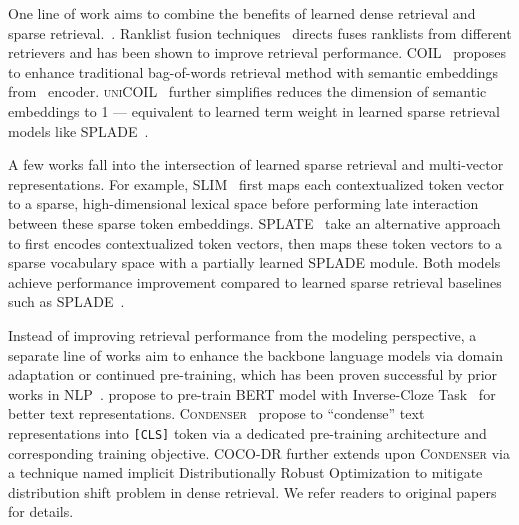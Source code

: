 One line of work aims to combine the benefits of learned dense retrieval and sparse retrieval.~\cite{gao2021complement,gao-etal-2021-coil,ma2021replication,lin2021few,cormack2009reciprocal}.
Ranklist fusion techniques~\cite[e.g., Reciprocal Rank Fusion,][]{cormack2009reciprocal} directs fuses ranklists from different retrievers and has been shown to improve retrieval performance. \textsc{COIL}~\cite{gao-etal-2021-coil} proposes to enhance traditional bag-of-words retrieval method with semantic embeddings from \bert~encoder. \textsc{uniCOIL}~\cite{lin2021few} further simplifies reduces the dimension of semantic embeddings to 1 --- equivalent to learned term weight in learned sparse retrieval models like \textsc{SPLADE}~\cite{formal21splade,formal21spladev2}. 

A few works fall into the intersection of learned sparse retrieval and multi-vector representations. For example, \textsc{SLIM}~\cite{li2023slim} first maps each contextualized token vector to a sparse, high-dimensional lexical space before performing late interaction between these sparse token embeddings. \textsc{SPLATE}~\cite{formal2024splate} take an alternative approach to first encodes contextualized token vectors, then maps these token vectors to a sparse vocabulary space with a partially learned \textsc{SPLADE} module. Both models achieve performance improvement compared to learned sparse retrieval baselines such as \textsc{SPLADE}~\cite{formal21splade,formal21spladev2}.

Instead of improving retrieval performance from the modeling perspective, a separate line of works aim to enhance the backbone language models via domain adaptation or continued pre-training, which has been proven successful by prior works in NLP~\cite{howard2018universal,gururangan-etal-2020-dont}. 
\citet{Lee2019LatentRF} propose to pre-train \textsc{BERT} model with Inverse-Cloze Task~\cite{Taylor1953ClozePA} for better text representations.
\textsc{Condenser}~\cite{gao-callan-2021-condenser} propose to ``condense'' text representations into \texttt{[CLS]} token via a dedicated pre-training architecture and corresponding training objective. 
\textsc{COCO-DR} further extends upon \textsc{Condenser} via a technique named implicit Distributionally Robust Optimization to mitigate distribution shift problem in dense retrieval. We refer readers to original papers for details.


